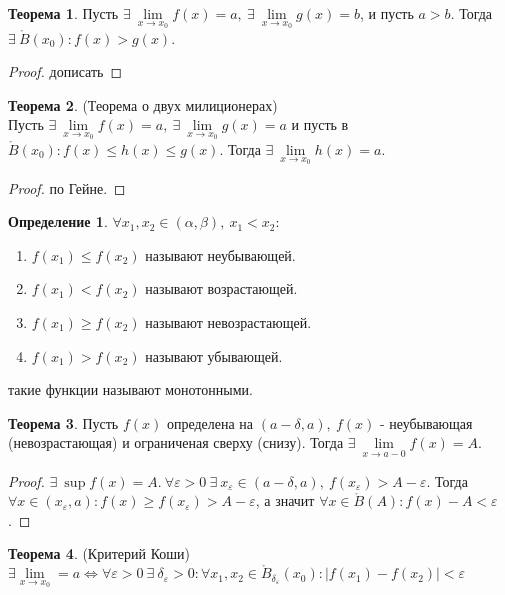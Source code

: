 \documentclass[a4paper, 12pt]{article}
\newcommand{\Bo}{\mathring{B}}
\renewcommand{\epsilon}{\varepsilon}
\theoremstyle{definition}
\newtheorem*{definition}{Определение}
\newtheorem*{theorem}{Теорема}
\begin{document}
        \begin{theorem}
            Пусть $\exists\ \lim\limits_{x\to x_0}f(x)=a,\ \exists\ \lim\limits_{x\to x_0}g(x)=b$, и пусть $a>b$. Тогда $\exists\ \Bo(x_0): f(x)>g(x)$.
        \end{theorem}
        \begin{proof}
            дописать
        \end{proof} 
        \begin{theorem}(Теорема о двух милиционерах)\\
            Пусть $\exists\ \lim\limits_{x\to x_0}f(x)=a,\ \exists\ \lim\limits_{x\to x_0}g(x)=a$ и пусть в $\Bo(x_0): f(x)\leq h(x)\leq g(x)$. Тогда $\exists\ \lim\limits_{x\to x_0}h(x)=a$.
        \end{theorem} 
        \begin{proof}
            по Гейне.
        \end{proof} 
        \begin{definition}
            $\forall x_1, x_2\in (\alpha, \beta),\ x_1<x_2$:
            \begin{enumerate}
                \item $f(x_1)\leq f(x_2)$ называют неубывающей.
                \item $f(x_1)< f(x_2)$ называют возрастающей.
                \item $f(x_1)\geq f(x_2)$ называют невозрастающей.
                \item $f(x_1)> f(x_2)$ называют убывающей.
            \end{enumerate}
            такие функции называют монотонными.
        \end{definition} 
        \begin{theorem}
            Пусть $f(x)$ определена на $(a-\delta, a),\ f(x)$ - неубывающая (невозрастающая) и ограниченая сверху (снизу). Тогда $\exists\ \lim\limits_{x\to a-0}f(x)=A$.
        \end{theorem} 
        \begin{proof}
            $\exists\ \sup{f(x)}=A.\ \forall \epsilon>0\ \exists\ x_{\epsilon}\in (a-\delta, a),\ f(x_{\epsilon})>A-\epsilon$. Тогда $\forall x\in (x_{\epsilon},a): f(x)\geq f(x_{\epsilon})>A-\epsilon$, а значит $\forall x\in \Bo(A): f(x)-A<\epsilon$.
        \end{proof}
        \begin{theorem} (Критерий Коши)\\
            $\exists \lim\limits_{x\to x_0}=a \Leftrightarrow \forall \epsilon>0\ \exists\ \delta_{\epsilon}>0: \forall x_1,x_2\in \Bo_{\delta_{\epsilon}}(x_0): |f(x_1)-f(x_2)|<\epsilon$
        \end{theorem} 
\end{document}
